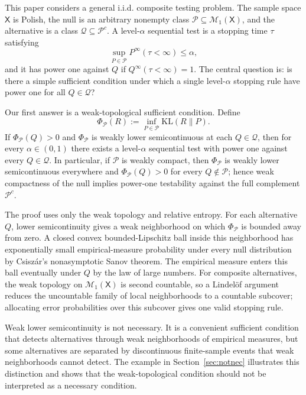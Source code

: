 \documentclass[11pt]{article}
\newcommand{\KL}{\mathrm{KL}}
\newcommand{\Pcal}{\mathcal{P}}
\newcommand{\Qcal}{\mathcal{Q}}
\newcommand{\X}{\mathsf{X}}
\theoremstyle{definition}
\theoremstyle{definition}
\begin{document}
This paper considers a general i.i.d. composite testing problem.  The sample space $\X$ is Polish, the null is an arbitrary nonempty class $\Pcal\subseteq\mathcal M_1(\X)$, and the alternative is a class $\Qcal\subseteq\Pcal^c$.  A level-$\alpha$ sequential test is a stopping time $\tau$ satisfying
\[
  \sup_{P\in\Pcal}P^\infty(\tau<\infty)\le \alpha,
\]
and it has power one against $Q$ if $Q^\infty(\tau<\infty)=1$.  The central question is: is there a simple sufficient condition under which a single level-$\alpha$ stopping rule have power one for all $Q\in\Qcal$?

Our first answer is a weak-topological sufficient condition.  Define
\[
  \Phi_\Pcal(R):=\inf_{P\in\Pcal}\KL(R\|P).
\]
If $\Phi_\Pcal(Q)>0$ and $\Phi_\Pcal$ is weakly lower semicontinuous at each $Q\in\Qcal$, then for every $\alpha\in(0,1)$ there exists a level-$\alpha$ sequential test with power one against every $Q\in\Qcal$.  In particular, if $\Pcal$ is weakly compact, then $\Phi_\Pcal$ is weakly lower semicontinuous everywhere and $\Phi_\Pcal(Q)>0$ for every $Q\notin\Pcal$; hence weak compactness of the null implies power-one testability against the full complement $\Pcal^c$.

The proof uses only the weak topology and relative entropy.  For each alternative $Q$, lower semicontinuity gives a weak neighborhood on which $\Phi_\Pcal$ is bounded away from zero.  A closed convex bounded-Lipschitz ball inside this neighborhood has exponentially small empirical-measure probability under every null distribution by Csisz\'ar's nonasymptotic Sanov theorem.  The empirical measure enters this ball eventually under $Q$ by the law of large numbers.  For composite alternatives, the weak topology on $\mathcal M_1(\X)$ is second countable, so a Lindel\"of argument reduces the uncountable family of local neighborhoods to a countable subcover; allocating error probabilities over this subcover gives one valid stopping rule.

Weak lower semicontinuity is not necessary.  It is a convenient sufficient condition that detects alternatives through weak neighborhoods of empirical measures, but some alternatives are separated by discontinuous finite-sample events that weak neighborhoods cannot detect.  The example in Section~\ref{sec:notnec} illustrates this distinction and shows that the weak-topological condition should not be interpreted as a necessary condition.
\end{document}
